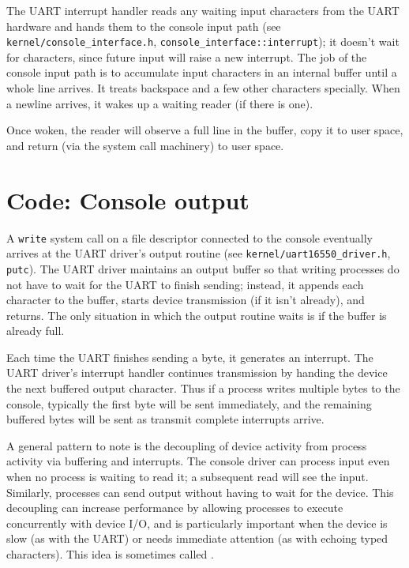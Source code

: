 The UART interrupt handler reads any waiting input characters from the UART hardware
and hands them to the console input path
(see \texttt{kernel/console\_interface.h}, \texttt{console\_interface::interrupt});
it doesn't wait for characters, since future input will raise a new interrupt.
The job of the console input path is to accumulate input characters in an internal buffer
until a whole line arrives.
It treats backspace and a few other characters specially.
When a newline arrives, it wakes up a waiting reader (if there is one).

Once woken, the reader will observe a full line in the buffer, copy it to user space,
and return (via the system call machinery) to user space.

\section{Code: Console output}

A {\tt write} system call on a file descriptor connected to the console
eventually arrives at the UART driver's output routine
(see \texttt{kernel/uart16550\_driver.h}, \texttt{putc}).
The UART driver maintains an output buffer so that writing processes do not have to
wait for the UART to finish sending; instead, it appends each character to the buffer,
starts device transmission (if it isn't already), and returns. The only situation in which
the output routine waits is if the buffer is already full.

Each time the UART finishes sending a byte, it generates an interrupt.
The UART driver's interrupt handler continues transmission by handing the device the
next buffered output character. Thus if a process writes multiple bytes to the
console, typically the first byte will be sent immediately, and the remaining buffered bytes
will be sent as transmit complete interrupts arrive.

A general pattern to note is the decoupling of device activity from
process activity via buffering and interrupts. The console driver can
process input even when no process is waiting to read it; a subsequent
read will see the input. Similarly, processes can send output without
having to wait for the device. This decoupling can increase
performance by allowing processes to execute concurrently with device
I/O, and is particularly important when the device is slow (as with
the UART) or needs immediate attention (as with echoing typed
characters). This idea is sometimes called .

